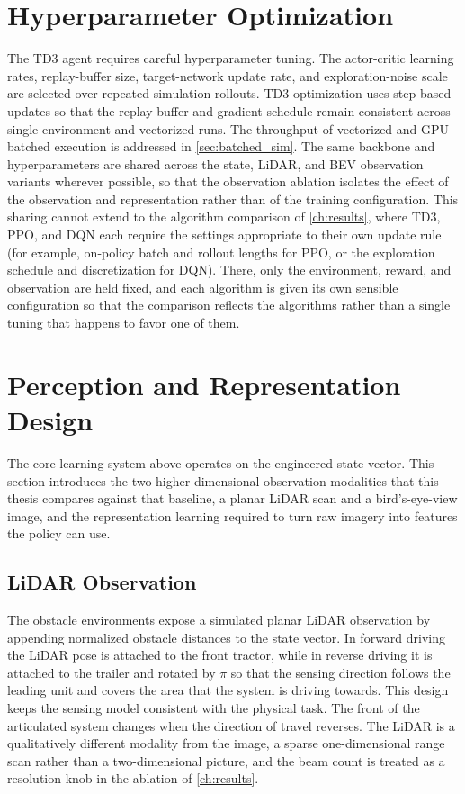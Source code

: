 \section{Hyperparameter Optimization}
\label{sec:hpo}

The TD3 agent requires careful hyperparameter tuning. The actor-critic learning rates, replay-buffer size, target-network update rate, and exploration-noise scale are selected over repeated simulation rollouts. TD3 optimization uses step-based updates so that the replay buffer and gradient schedule remain consistent across single-environment and vectorized runs. The throughput of vectorized and GPU-batched execution is addressed in \cref{sec:batched_sim}. The same backbone and hyperparameters are shared across the state, LiDAR, and BEV observation variants wherever possible, so that the observation ablation isolates the effect of the observation and representation rather than of the training configuration. This sharing cannot extend to the algorithm comparison of \cref{ch:results}, where TD3, PPO, and DQN each require the settings appropriate to their own update rule (for example, on-policy batch and rollout lengths for PPO, or the exploration schedule and discretization for DQN). There, only the environment, reward, and observation are held fixed, and each algorithm is given its own sensible configuration so that the comparison reflects the algorithms rather than a single tuning that happens to favor one of them.

\section{Perception and Representation Design}
\label{sec:perception}

The core learning system above operates on the engineered state vector. This section introduces the two higher-dimensional observation modalities that this thesis compares against that baseline, a planar LiDAR scan and a bird's-eye-view image, and the representation learning required to turn raw imagery into features the policy can use.

\subsection{LiDAR Observation}

The obstacle environments expose a simulated planar LiDAR observation by appending normalized obstacle distances to the state vector. In forward driving the LiDAR pose is attached to the front tractor, while in reverse driving it is attached to the trailer and rotated by $\pi$ so that the sensing direction follows the leading unit and covers the area that the system is driving towards. This design keeps the sensing model consistent with the physical task. The front of the articulated system changes when the direction of travel reverses. The LiDAR is a qualitatively different modality from the image, a sparse one-dimensional range scan rather than a two-dimensional picture, and the beam count is treated as a resolution knob in the ablation of \cref{ch:results}.

